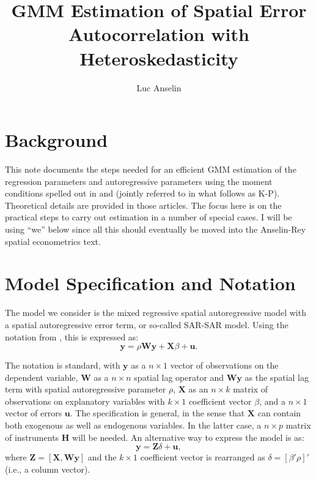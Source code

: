 \documentclass{article}
\title{GMM Estimation of Spatial Error Autocorrelation with Heteroskedasticity}
\author{Luc Anselin}
\begin{document}
\maketitle
\section{Background}
This note documents the steps needed for an efficient GMM estimation of the
regression parameters and autoregressive parameters using the moment conditions
spelled out in \cite{KelejianPrucha:09} and \cite{Arraizetal:10} (jointly referred to in what
follows as K-P). Theoretical details are
provided in those articles. The focus here is on the practical steps to carry out estimation
in a number of special cases. I will be using ``we'' below since all this should eventually
be moved into the Anselin-Rey spatial econometrics text.

\section{Model Specification and Notation}

The model we consider is the mixed regressive spatial autoregressive model with
a spatial autoregressive error term, or so-called SAR-SAR model. Using the notation from \cite{Anselin:88}, this
is expressed as:
\begin{equation*}
    \mathbf{y} = \rho \mathbf{Wy} + \mathbf{X} \beta + \mathbf{u}.
    \label{model1}
\end{equation*}

The notation is standard, with $\mathbf{y}$ as a $n \times 1$ vector of observations
on the dependent variable, $\mathbf{W}$ as a $n \times n$ spatial lag operator and
$\mathbf{Wy}$ as the spatial lag term with spatial autoregressive parameter
$\rho$, $\mathbf{X}$ as an $n \times k$ matrix of observations
on explanatory variables with $k \times 1$ coefficient vector $\beta$, and a
$n \times 1$ vector of errors $\mathbf{u}$. The specification is general, in the
sense that $\mathbf{X}$ can contain both exogenous as well as endogenous variables.
In the latter case, a $n \times p$ matrix of instruments $\mathbf{H}$ will be needed.
An alternative way to express the model is as:
\begin{equation}\label{eq:generic}
\mathbf{y} = \mathbf{Z} \delta + \mathbf{u},
\end{equation}
where $\mathbf{Z} = [ \mathbf{X}, \mathbf{Wy} ]$ and the $k \times 1$ coefficient
vector is rearranged as $\delta = [\beta' \rho ]'$ (i.e., a column vector).
\end{document}

